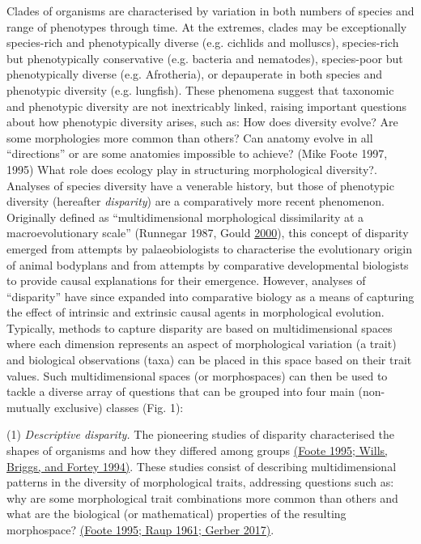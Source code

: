 Clades of organisms are characterised by variation in both numbers of
species and range of phenotypes through time. At the extremes, clades
may be exceptionally species-rich and phenotypically diverse (e.g.
cichlids and molluscs), species-rich but phenotypically conservative
(e.g. bacteria and nematodes), species-poor but phenotypically diverse
(e.g. Afrotheria), or depauperate in both species and phenotypic
diversity (e.g. lungfish). These phenomena suggest that taxonomic and
phenotypic diversity are not inextricably linked, raising important
questions about how phenotypic diversity arises, such as: How does
diversity evolve? Are some morphologies more common than others? Can
anatomy evolve in all ``directions'' or are some anatomies impossible to
achieve? (Mike Foote 1997, 1995) What role does ecology play in
structuring morphological diversity?. Analyses of species diversity have
a venerable history, but those of phenotypic diversity (hereafter
\emph{disparity}) are a comparatively more recent phenomenon. Originally
defined as ``multidimensional morphological dissimilarity at a
macroevolutionary scale'' (Runnegar 1987, Gould
\href{https://paperpile.com/c/sTGYvp/Uns3}{2000}), this concept of
disparity emerged from attempts by palaeobiologists to characterise the
evolutionary origin of animal bodyplans and from attempts by comparative
developmental biologists to provide causal explanations for their
emergence. However, analyses of ``disparity'' have since expanded into
comparative biology as a means of capturing the effect of intrinsic and
extrinsic causal agents in morphological evolution. Typically, methods
to capture disparity are based on multidimensional spaces where each
dimension represents an aspect of morphological variation (a trait) and
biological observations (taxa) can be placed in this space based on
their trait values. Such multidimensional spaces (or morphospaces) can
then be used to tackle a diverse array of questions that can be grouped
into four main (non-mutually exclusive) classes (Fig. 1):

(1) \emph{Descriptive disparity.} The pioneering studies of disparity
characterised the shapes of organisms and how they differed among groups
\href{https://paperpile.com/c/sTGYvp/fTJ3+eZ3F}{(Foote 1995; Wills,
Briggs, and Fortey 1994)}. These studies consist of describing
multidimensional patterns in the diversity of morphological traits,
addressing questions such as: why are some morphological trait
combinations more common than others and what are the biological (or
mathematical) properties of the resulting morphospace?
\href{https://paperpile.com/c/sTGYvp/fTJ3+I0Ic+QVvv}{(Foote 1995; Raup
1961; Gerber 2017)}.

